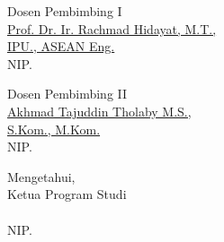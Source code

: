 \begin{center}
    \noindent
    \begin{minipage}[t]{0.48\textwidth}
        \centering
        Dosen Pembimbing I\\[1.6cm]
        \underline{Prof. Dr. Ir. Rachmad Hidayat, M.T.,}\\
        \underline{IPU., ASEAN Eng.}\\[2pt]
        NIP. \skripsiNIKPembimbingSatu
    \end{minipage}\hfill
    \begin{minipage}[t]{0.48\textwidth}
        \centering
        Dosen Pembimbing II\\[1.6cm]
        \underline{Akhmad Tajuddin Tholaby M.S.,}\\
        \underline{S.Kom., M.Kom.}\\[2pt]
        NIP. \skripsiNIKPembimbingDua
    \end{minipage}
    
    \vspace{0.95cm}
    
    Mengetahui,\\
    Ketua Program Studi\\[1.6cm]
    \underline{\skripsiKaprodi}\\[2pt]
    NIP. \skripsiNIKKaprodi

\end{center}
